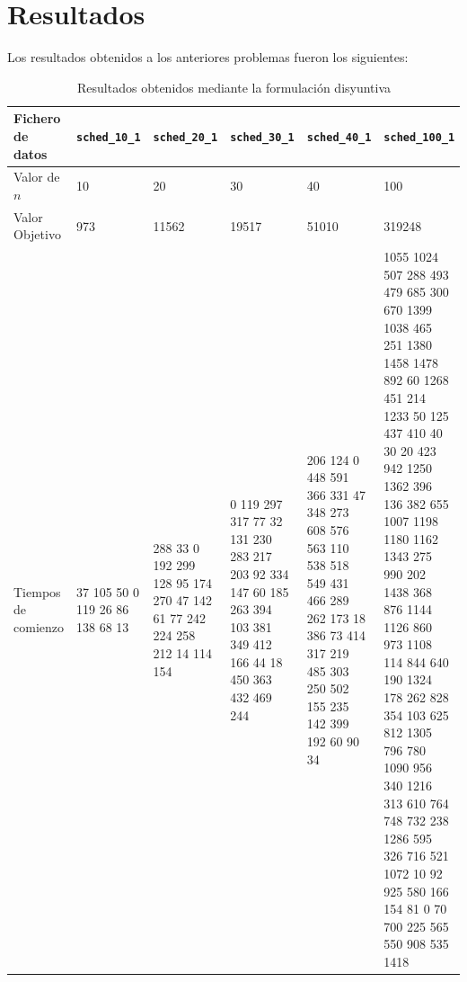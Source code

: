 \documentclass[a4paper,11pt]{article}
\begin{document}
\newpage
\section{Resultados}
Los resultados obtenidos a los anteriores problemas fueron los siguientes:

\begin{table}[!htbp]
\label{tb:results_disyuntiva}
\centering\scriptsize
\begin{tabularx}{\textwidth}{|X|X|X|X|X|X|}
\hline
Fichero de datos	& \texttt{sched\_10\_1}	& \texttt{sched\_20\_1}	& \texttt{sched\_30\_1}	& \texttt{sched\_40\_1}	& \texttt{sched\_100\_1}	\\ \hline
Valor de $n$        & 10    & 20    & 30    & 40    & 100   \\ \hline
Valor Objetivo		& 973	& 11562	& 19517	& 51010	& 319248	\\ \hline
Tiempos de comienzo	& 37 105 50 0 119 26 86 138 68 13 & 288 33 0 192 299 128 95 174 270 47 142 61 77 242 224 258 212 14 114 154 & 0 119 297 317 77 32 131 230 283 217 203 92 334 147 60 185 263 394 103 381 349 412 166 44 18 450 363 432 469 244 & 206 124 0 448 591 366 331 47 348 273 608 576 563 110 538 518 549 431 466 289 262 173 18 386 73 414 317 219 485 303 250 502 155 235 142 399 192 60 90 34 & 1055 1024 507 288 493 479 685 300 670 1399 1038 465 251 1380 1458 1478 892 60 1268 451 214 1233 50 125 437 410 40 30 20 423 942 1250 1362 396 136 382 655 1007 1198 1180 1162 1343 275 990 202 1438 368 876 1144 1126 860 973 1108 114 844 640 190 1324 178 262 828 354 103 625 812 1305 796 780 1090 956 340 1216 313 610 764 748 732 238 1286 595 326 716 521 1072 10 92 925 580 166 154 81 0 70 700 225 565 550 908 535 1418 \\ \hline
\end{tabularx}
\caption{Resultados obtenidos mediante la formulación disyuntiva}
\end{table}
\end{document}
